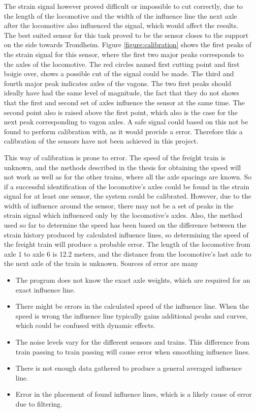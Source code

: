 The strain signal however proved difficult or impossible to cut correctly, due to the length of the locomotive and the width of the influence line the next axle after the locomotive also influenced the signal, which would affect the results. The best suited sensor for this task proved to be the sensor closes to the support on the side towards Trondheim. Figure \ref{figure:calibration} shows the first peaks of the strain signal for this sensor, where the first two major peaks corresponds to the axles of the locomotive. The red circles named first cutting point and first boigie over, shows a possible cut of the signal could be made. The third and fourth major peak indicates axles of the vagons. The two first peaks should ideally have had the same level of magnitude, the fact that they do not shows that the first and second set of axles influence the sensor at the same time. The second point also is raised above the first point, which also is the case for the next peak corresponding to vagon axles. A safe signal could based on this not be found to perform calibration with, as it would provide a error. Therefore this a calibration of the sensors have not been achieved in this project.



This way of calibration is prone to error. The speed of the freight train is unknown, and the methods described in the thesis for obtaining the speed will not work as well as for the other trains, where all the axle spacings are known.
 So if a successful identification of the locomotive's axles could be found in the strain signal for at least one sensor, the system could be calibrated.
However, due to the width of influence around the sensor, there may not be a set of peaks in the strain signal which influenced only by the locomotive's axles. Also, the method used so far to determine the speed has been based on the difference between the strain history produced by calculated influence lines, so determining the speed of the freight train will produce a probable error.
The length of the locomotive from axle 1 to axle 6 is 12.2 meters, and the distance from the locomotive's last axle to the next axle of the train is unknown.
Sources of error are many
\begin{itemize}
	\item The program does not know the exact axle weights, which are required for an exact influence line.
	\item There might be errors in the calculated speed of the influence line. When the speed is wrong the influence line typically gains additional peaks and curves, which could be confused with dynamic effects.
	\item The noise levels vary for the different sensors and trains. This difference from train passing to train passing will cause error when smoothing influence lines.
	\item There is not enough data gathered to produce a general averaged influence line.
	\item Error in the placement of found influence lines, which is a likely cause of error due to filtering.
\end{itemize}
